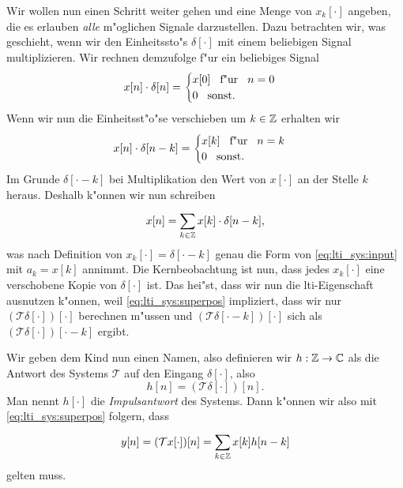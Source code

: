 Wir wollen nun einen Schritt weiter gehen und eine Menge von $x_k[\cdot]$ angeben, die es erlauben \emph{alle} m"oglichen Signale darzustellen.
Dazu betrachten wir, was geschieht, wenn wir den Einheitssto"s $\delta[\cdot]$ mit einem beliebigen Signal multiplizieren.
Wir rechnen demzufolge f"ur ein beliebiges Signal
\[
x[n] \cdot \delta[n] = \begin{cases}
    x[0] {\hspace{3mm} \text{f"ur} \hspace{3mm}} n = 0 \\
    0 {\hspace{3mm} \text{sonst.} \hspace{3mm}}
\end{cases}
\]
Wenn wir nun die Einheitsst"o"se verschieben um $k \in \mathbb{Z}$ erhalten wir
\[
    x[n] \cdot \delta[n-k] = \begin{cases}
        x[k] {\hspace{3mm} \text{f"ur} \hspace{3mm}} n = k \\
        0 {\hspace{3mm} \text{sonst.} \hspace{3mm}}
    \end{cases}
\]
Im Grunde  $\delta[\cdot-k]$ bei Multiplikation den Wert von $x[\cdot]$ an der Stelle $k$ heraus.
Deshalb k"onnen wir nun schreiben
\begin{equation}
    x[n] = {\sum\limits_{k \in \mathbb{Z}}^{}{
        x[k] \cdot \delta[n-k],
    }}
\end{equation}
was nach Definition von $x_k[\cdot] = \delta[\cdot - k]$ genau die Form von \eqref{eq:lti_sys:input} mit $a_k = x[k]$ annimmt.
Die Kernbeobachtung ist nun, dass jedes $x_k[\cdot]$ eine verschobene Kopie von $\delta[\cdot]$ ist. 
Das hei"st, dass wir nun die \gls{lti}-Eigenschaft ausnutzen k"onnen, weil \eqref{eq:lti_sys:superpos} impliziert, dass wir nur $(\mathcal{T}\delta[\cdot])[\cdot]$ berechnen m"ussen und $(\mathcal{T}\delta[\cdot - k])[\cdot]$ sich als $(\mathcal{T}\delta[\cdot])[\cdot - k]$ ergibt.

Wir geben dem Kind nun einen Namen, also definieren wir $h: \mathbb{Z} \rightarrow \mathbb{C}$ als die Antwort des Systems $\mathcal{T}$ auf den Eingang $\delta[\cdot]$, also
\begin{equation}\label{eq:lti_sys:ir}
    h[n] = (\mathcal{T} \delta[\cdot])[n].
\end{equation}
Man nennt $h[\cdot]$ die \emph{Impulsantwort} des Systems.
Dann k"onnen wir also mit \eqref{eq:lti_sys:superpos} folgern, dass
\begin{equation}\label{eq:lti_sys:conv}
    y[n] 
        = (\mathcal{T} x[\cdot])[n] 
        = {\sum\limits_{k \in \mathbb{Z}}^{}{
            x[k] h[n-k]
        }}
\end{equation}
gelten muss.

